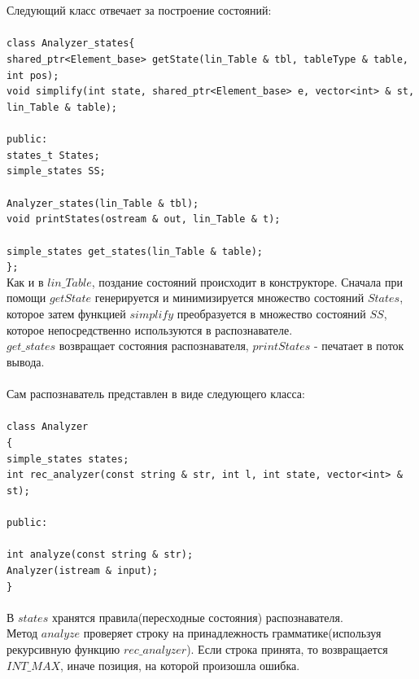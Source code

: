 \documentclass[12pt]{article}
\newcommand\tab[1][1cm]{\hspace*{#1}}
\begin{document}
Следующий класс отвечает за построение состояний:\\
\texttt{
\\
class Analyzer\_states\{\\
\tab 	shared\_ptr<Element\_base> getState(lin\_Table \& tbl, tableType \& table, int pos);\\
\tab 	void simplify(int state, shared\_ptr<Element\_base> e, vector<int> \& st, lin\_Table \& table);\\
\\
public:\\
\tab 	states\_t States;\\
\tab 	simple\_states SS;\\
\\
\tab 	Analyzer\_states(lin\_Table \& tbl);\\
\tab 	void printStates(ostream \& out, lin\_Table \& t);\\
\\
\tab 	simple\_states get\_states(lin\_Table \& table);\\
\};}\\

Как и в $lin\_Table$, поздание состояний происходит в конструкторе. Сначала при помощи $getState$ генерируется и минимизируется множество состояний $States$, которое затем функцией $simplify$ преобразуется в множество состояний $SS$, которое непосредственно используются в распознавателе.\\
$get\_states$ возвращает состояния распознавателя, $printStates$ - печатает в поток вывода.
\\
\\

Сам распознаватель представлен в виде следующего класса:\\
\\
\texttt{class Analyzer\\
\{\\
\tab 	simple\_states states;\\
\tab 	int rec\_analyzer(const string \& str, int l, int state, vector<int> \& st);\\
\\
public:\\
\\
\tab 	int analyze(const string \& str);\\
\tab 	Analyzer(istream \& input){};\\
\}\\
}\\

В $states$ хранятся правила(пересходные состояния) распознавателя.\\
Метод $analyze$ проверяет строку на принадлежность грамматике(используя рекурсивную функцию $rec\_analyzer$). Если строка принята, то возвращается $INT\_MAX$, иначе позиция, на которой произошла ошибка.
\\
\end{document}

